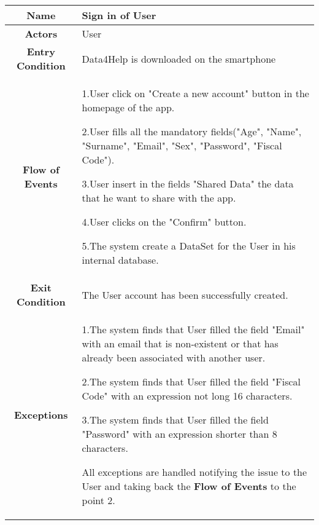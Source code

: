 
     \begin{table}[h!]
   \centering
    \begin{tabularx}{\linewidth}{|c|X|}
         \hline
         \textbf{Name} & Sign in of User\\
	\hline
	\textbf{Actors} & User \\
	\hline
	\textbf{Entry Condition} & Data4Help is downloaded on the smartphone \\
	\hline
	\textbf{Flow of Events} & 1.User click on "Create a new account" button in the homepage of the app.

					2.User fills all the mandatory fields("Age", "Name", "Surname", "Email", "Sex", "Password", "Fiscal 							Code").

					3.User insert in the fields "Shared Data" the data that he want to share with the app.

					4.User clicks on the "Confirm" button.

					5.The system create a DataSet for the User in his internal database.\\
	\hline
	\textbf{Exit Condition} & The User account has been successfully created. \\
	\hline
	\textbf{Exceptions} & 
					1.The system finds that User filled the field "Email"  with an email that is non-existent or that has 							already been associated with another user.

					2.The system finds that User filled the field "Fiscal Code" with an expression not long 16 								characters.

					3.The system finds that User filled the field "Password" with an expression shorter than 8 								characters.

					All exceptions are handled notifying the issue to the User and taking back the \textbf{Flow of 							Events} to the point 2.\\
        \hline
      \end{tabularx}        
      \end{table}

